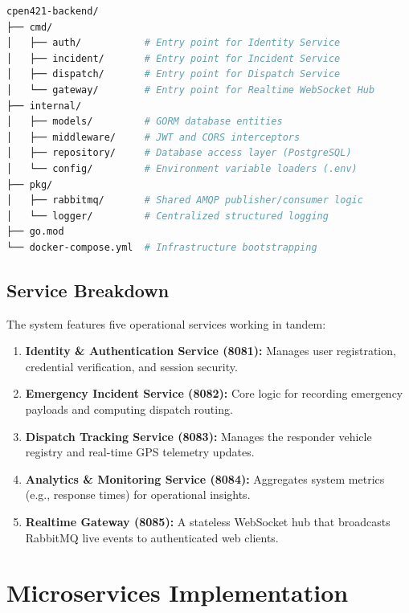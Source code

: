 \documentclass[12pt,a4paper]{report}
\begin{document}
\begin{lstlisting}[language=bash, caption=Backend Monorepo Directory Structure, numbers=none]
cpen421-backend/
├── cmd/
│   ├── auth/           # Entry point for Identity Service
│   ├── incident/       # Entry point for Incident Service
│   ├── dispatch/       # Entry point for Dispatch Service
│   └── gateway/        # Entry point for Realtime WebSocket Hub
├── internal/
│   ├── models/         # GORM database entities
│   ├── middleware/     # JWT and CORS interceptors
│   ├── repository/     # Database access layer (PostgreSQL)
│   └── config/         # Environment variable loaders (.env)
├── pkg/
│   ├── rabbitmq/       # Shared AMQP publisher/consumer logic
│   └── logger/         # Centralized structured logging
├── go.mod
└── docker-compose.yml  # Infrastructure bootstrapping
\end{lstlisting}

\section{Service Breakdown}

The system features five operational services working in tandem:

\begin{enumerate}
	\item \textbf{Identity \& Authentication Service (8081):} Manages user registration, credential verification, and session security.
	\item \textbf{Emergency Incident Service (8082):} Core logic for recording emergency payloads and computing dispatch routing.
	\item \textbf{Dispatch Tracking Service (8083):} Manages the responder vehicle registry and real-time GPS telemetry updates.
	\item \textbf{Analytics \& Monitoring Service (8084):} Aggregates system metrics (e.g., response times) for operational insights.
	\item \textbf{Realtime Gateway (8085):} A stateless WebSocket hub that broadcasts RabbitMQ live events to authenticated web clients.
\end{enumerate}

\newpage

\chapter{Microservices Implementation}
\end{document}
